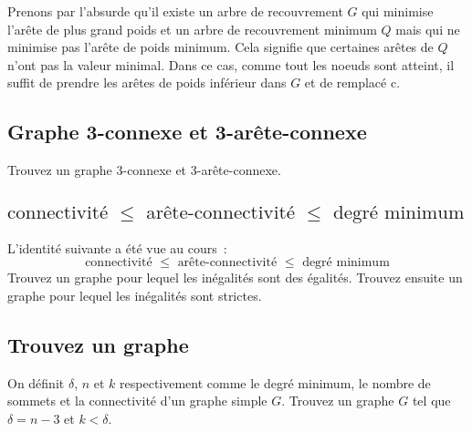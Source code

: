 \begin{solution}
Prenons par l'absurde qu'il existe un arbre de recouvrement $G$ qui minimise l'arête de plus grand poids et un arbre de recouvrement minimum $Q$ mais qui ne minimise pas l'arête de poids minimum. Cela signifie que certaines arêtes de $Q$ n'ont pas la valeur minimal. Dans ce cas, comme tout les noeuds sont atteint, il suffit de prendre les arêtes de poids inférieur dans $G$ et de remplacé c.
\end{solution}

\subsection{Graphe 3-connexe et 3-arête-connexe}
Trouvez un graphe 3-connexe et 3-arête-connexe.

\subsection{$ \text{connectivité } \leq \text{ arête-connectivité } \leq \text{ degré minimum} $}
L'identité suivante a été vue au cours~:
\[
  \text{connectivité } \leq \text{ arête-connectivité } \leq \text{ degré minimum}
\]
Trouvez un graphe pour lequel les inégalités sont des égalités. Trouvez ensuite un graphe pour lequel les inégalités sont strictes.

\subsection{Trouvez un graphe}
On définit $\delta$, $n$ et $k$ respectivement comme le degré minimum, le nombre de sommets et la connectivité d'un graphe simple $G$. Trouvez un graphe $G$ tel que $\delta = n-3$ et $k < \delta$.
